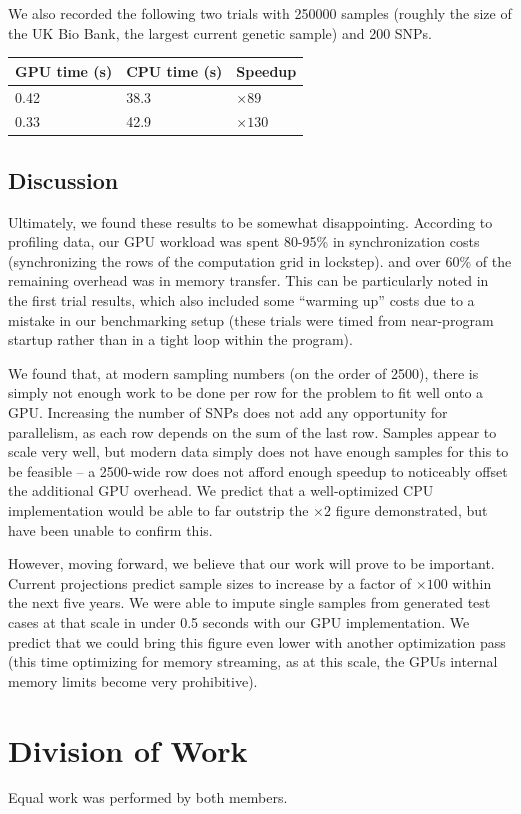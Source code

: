 \documentclass[12pt]{article}
\begin{document}
We also recorded the following two trials with 250000 samples
(roughly the size of the UK Bio Bank, the largest current genetic sample)
and 200 SNPs.

\begin{table}[!ht]
  \begin{tabular}{ll|l}
    GPU time (s) & CPU time (s) & Speedup \\
    \hline
    0.42 & 38.3 & $\times 89$ \\
    0.33 & 42.9 & $\times 130$ \\
  \end{tabular}
\end{table}

\subsection{Discussion}

Ultimately, we found these results to be somewhat disappointing. According to
profiling data, our GPU workload was spent 80-95\% in synchronization costs
(synchronizing the rows of the computation grid in lockstep). and over 60\% of
the remaining overhead was in memory transfer. This can be particularly noted
in the first trial results, which also included some ``warming up'' costs due
to a mistake in our benchmarking setup (these trials were timed from
near-program startup rather than in a tight loop within the program).

We found that, at modern sampling numbers (on the order of 2500), there is
simply not enough work to be done per row for the problem to fit well onto a
GPU. Increasing the number of SNPs does not add any opportunity for
parallelism, as each row depends on the sum of the last row. Samples appear to
scale very well, but modern data simply does not have enough samples for this
to be feasible -- a 2500-wide row does not afford enough speedup to noticeably
offset the additional GPU overhead. We predict that a well-optimized CPU
implementation would be able to far outstrip the $\times 2$ figure
demonstrated, but have been unable to confirm this.

However, moving forward, we believe that our work will prove to be important.
Current projections predict sample sizes to increase by a factor of $\times
100$ within the next five years. We were able to impute single samples from
generated test cases at that scale in under 0.5 seconds with our GPU
implementation. We predict that we could bring this figure even lower with
another optimization pass (this time optimizing for memory streaming, as at
this scale, the GPUs internal memory limits become very prohibitive).

\section{Division of Work}

Equal work was performed by both members.



\end{document}
